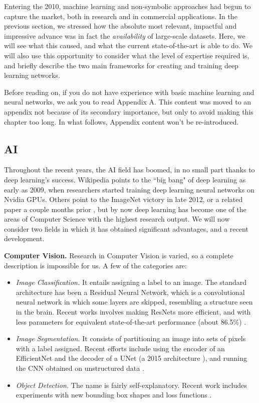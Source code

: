 \documentclass[../main.tex]{subfiles}
\begin{document}
Entering the 2010, machine learning and non-symbolic approaches had begun to capture the market, both in research and in commercial applications. In the previous section, we stressed how the absolute most relevant, impactful and impressive advance was in fact the \textit{availability} of large-scale datasets. Here, we will see what this caused, and what the current state-of-the-art is able to do. We will also use this opportunity to consider what the level of expertise required is, and briefly describe the two main frameworks for creating and training deep learning networks.

Before reading on, if you do not have experience with basic machine learning and neural networks, we ask you to read Appendix A. This content was moved to an appendix not because of its secondary importance, but only to avoid making this chapter too long. In what follows, Appendix content won't be re-introduced.

\subsection{AI}
Throughout the recent years, the AI field has boomed, in no small part thanks to deep learning's success. Wikipedia points to the ``big bang" of deep learning as early as 2009, when researchers started training deep learning neural networks on Nvidia GPUs. Others \parencite{parloffWhyDeepLearning2016} point to the ImageNet victory in late 2012, or a related paper a couple months prior \parencite{ciresanMulticolumnDeepNeural2012}, but by now deep learning has become one of the areas of Computer Science with the highest research output. We will now consider two fields in which it has obtained significant advantages, and a recent development.

\vspace{4pt}
\textbf{Computer Vision.} Research in Computer Vision is varied, so a complete description is impossible for us. A few of the categories are:
\begin{itemize}
    \item \textit{Image Classification.} It entails assigning a label to an image. The standard architecture has been a Residual Neural Network, which is a convolutional neural network in which some layers are skipped, resembling a structure seen in the brain. Recent works involves making ResNets more efficient, and with less parameters for equivalent state-of-the-art performance (about 86.5\%) \parencite{tanEfficientNetV2SmallerModels2021} \parencite{brockHighPerformanceLargeScaleImage2021}.
    \item \textit{Image Segmentation.} It consists of partitioning an image into sets of pixels with a label assigned. Recent efforts include using the encoder of an EfficientNet and the decoder of a UNet (a 2015 architecture  \parencite{ronnebergerUNetConvolutionalNetworks2015}), and running the CNN obtained on unstructured data  \parencite{bahetiEffUNetNovelArchitecture2020}.
    \item \textit{Object Detection.} The name is fairly self-explanatory. Recent work includes experiments with new bounding box shapes and loss functions  \parencite{zhangVarifocalNetIoUawareDense2020}.
\end{itemize}
\end{document}
